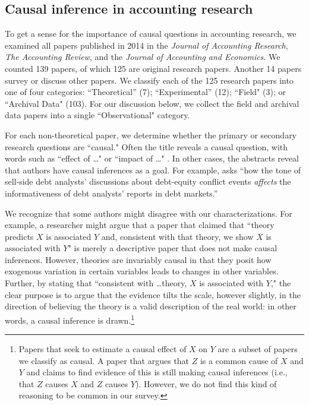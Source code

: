 \documentclass[12pt,reqno,titlepage]{amsart}
\theoremstyle{definition}
\begin{document}
\begin{doublespace}
\subsection{Causal inference in accounting research}

To get a sense for the importance of causal questions in accounting research,
we examined all papers published in 2014 in the \textit{Journal of Accounting Research}, \textit{The Accounting Review}, and the \textit{Journal of Accounting and Economics}.
We counted 139 papers, of which 125 are original research papers. Another 14 papers survey or discuss other papers.
We classify each of the 125 research papers into one of four categories:  ``Theoretical'' (7); ``Experimental'' (12); ``Field" (3); or ``Archival Data" (103). 
For our discussion below, we collect the field and archival data papers into a single  ``Observational" category.

For each non-theoretical paper, we determine whether the primary or secondary research questions are ``causal." 
Often the title reveals a causal question, with words such as ``effect of \dots" or ``impact of \dots" \citep[e.g.][]{Cohen:2014jl,Clorproell:2014cv}. 
In other cases, the abstracts reveal that authors have causal inferences as a goal. 
For example, \citet{deFranco:2014ct} asks ``how the tone of sell-side debt analysts' discussions about debt-equity conflict events \emph{affects} the informativeness of debt analysts' reports in debt markets.''

We recognize that some authors might disagree with our characterizations.
For example, a researcher might argue that a paper that claimed that ``theory predicts $X$ is associated $Y$ and, consistent with that theory, we show $X$ is associated with $Y$" is merely a descriptive paper that does not make causal inferences.
However, theories are invariably causal in that they posit how exogenous variation in certain variables leads to changes in other variables.
Further, by stating that ``consistent with \dots theory, $X$ is associated with $Y$," the clear purpose is to argue that the evidence tilts the scale, however slightly, in the direction of believing the theory is a valid description of the real world: in other words, a causal inference is drawn.\footnote{
Papers that seek to estimate a causal effect of $X$ on $Y$ are a subset of papers we classify as causal.
A paper that argues that $Z$ is a common cause of $X$ and $Y$ and claims to find evidence of this is still making causal inferences (i.e., that $Z$ causes $X$ and $Z$ causes $Y$).
However, we do not find this kind of reasoning to be common in our survey.}


\end{doublespace}
\end{document}
